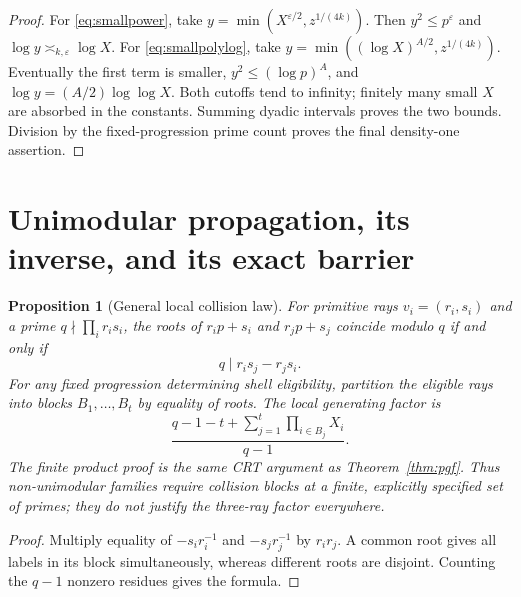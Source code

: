 \documentclass[11pt]{article}
\newtheorem{proposition}[theorem]{Proposition}
\theoremstyle{remark}\newtheorem{remark}[theorem]{Remark}
\begin{document}
\begin{proof}
For \eqref{eq:smallpower}, take
$y=\min(X^{\varepsilon/2},z^{1/(4k)})$.
Then $y^2\le p^\varepsilon$ and $\log y\asymp_{k,\varepsilon}\log X$.
For \eqref{eq:smallpolylog}, take
$y=\min((\log X)^{A/2},z^{1/(4k)})$.
Eventually the first term is smaller, $y^2\le(\log p)^A$, and
$\log y=(A/2)\log\log X$. Both cutoffs tend to infinity; finitely many small $X$ are absorbed in the constants. Summing dyadic intervals proves the two bounds. Division by the fixed-progression prime count proves the final density-one assertion.
\end{proof}

\section{Unimodular propagation, its inverse, and its exact barrier}\label{sec:lattice}
\begin{proposition}[General local collision law]\label{prop:collisions}
For primitive rays $v_i=(r_i,s_i)$ and a prime $q\nmid\prod_i r_is_i$, the roots of $r_ip+s_i$ and $r_jp+s_j$ coincide modulo $q$ if and only if
\[
 q\mid r_is_j-r_js_i.
\]
For any fixed progression determining shell eligibility, partition the eligible rays into blocks $B_1,\ldots,B_t$ by equality of roots. The local generating factor is
\[
 \frac{q-1-t+\sum_{j=1}^t\prod_{i\in B_j}X_i}{q-1}.
\]
The finite product proof is the same CRT argument as Theorem~\ref{thm:pgf}. Thus non-unimodular families require collision blocks at a finite, explicitly specified set of primes; they do not justify the three-ray factor everywhere.
\end{proposition}
\begin{proof}
Multiply equality of $-s_ir_i^{-1}$ and $-s_jr_j^{-1}$ by $r_ir_j$. A common root gives all labels in its block simultaneously, whereas different roots are disjoint. Counting the $q-1$ nonzero residues gives the formula.
\end{proof}
\end{document}
